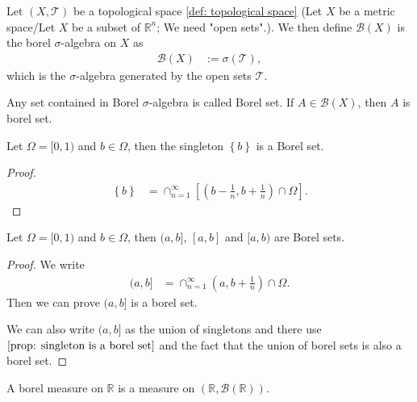 \documentclass[../../note.tex]{subfiles}
\begin{document}
\begin{definition}
    Let $(X, \mathcal{T})$ be a topological space \ref{def: topological space} (Let $X$ be a metric space/Let $X$ be a subset of $\mathbb{R}^n$; We need "open sets".). We then define $\mathcal{B}(X)$ is the borel $\sigma$-algebra on $X$ as
    \begin{align}
        \mathcal{B}(X)
        &:= \sigma(\mathcal{T}),
    \end{align}
    which is the $\sigma$-algebra generated by the open sets $\mathcal{T}$.
\end{definition}

\begin{definition}
    Any set contained in Borel $\sigma$-algebra is called Borel set. If $A \in \mathcal{B}(X)$, then $A$ is borel set.
\end{definition}

\begin{proposition}
    \label{prop: singleton is a borel set}
    Let $\Omega = [0,1)$ and $b \in \Omega$, then the singleton $\left\{b\right\}$ is a Borel set.
\end{proposition}
\begin{proof}
    \begin{align}
        \left\{b\right\}
        &= \cap_{n=1}^{\infty} \left[(b - \frac{1}{n}, b+\frac{1}{n}) \cap \Omega \right].
    \end{align}
\end{proof}

\begin{proposition}
    Let $\Omega = [0,1)$ and $b \in \Omega$, then $(a,b]$, $[a,b]$ and $[a,b)$ are Borel sets.
\end{proposition}
\begin{proof}
    We write
    \begin{align}
        (a,b]
        &= \cap_{n=1}^{\infty} (a, b+\frac{1}{n}) \cap \Omega.
    \end{align}
    Then we can prove $(a,b]$ is a borel set.

    We can also write $(a,b]$ as the union of singletons and there use $\ref{prop: singleton is a borel set}$ and the fact that the union of borel sets is also a borel set.
\end{proof}

\begin{definition}
    A borel measure on $\mathbb{R}$ is a measure on $(\mathbb{R}, \mathcal{B}(\mathbb{R}))$.
\end{definition}
\end{document}
